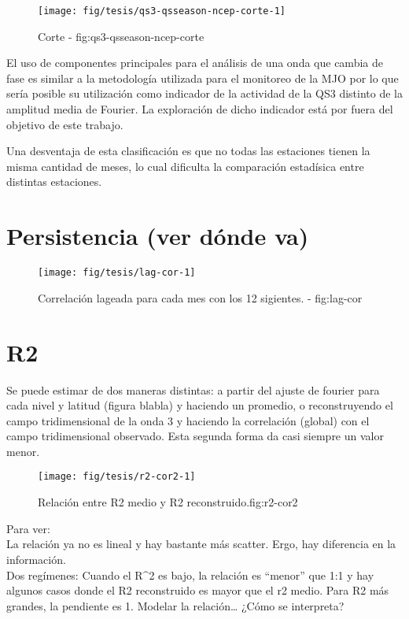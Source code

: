 \documentclass[spanish,a4paper]{book}
\begin{document}
\begin{figure*}
\texttt{[image: fig/tesis/qs3-qsseason-ncep-corte-1]} \caption{Corte - fig:qs3-qsseason-ncep-corte}\label{fig:qs3-qsseason-ncep-corte}
\end{figure*}

El uso de componentes principales para el análisis de una onda que
cambia de fase es similar a la metodología utilizada para el monitoreo
de la MJO por lo que sería posible su utilización como
indicador de la actividad de la QS3 distinto de la amplitud media de
Fourier. La exploración de dicho indicador está por fuera del objetivo
de este trabajo.

Una desventaja de esta clasificación es que no todas las estaciones
tienen la misma cantidad de meses, lo cual dificulta la comparación
estadísica entre distintas estaciones.

\section{Persistencia (ver dónde va)}\label{persistencia-ver-donde-va}

\begin{figure}
\texttt{[image: fig/tesis/lag-cor-1]} \caption{Correlación lageada para cada mes con los 12 sigientes. - fig:lag-cor}\label{fig:lag-cor}
\end{figure}

\section{R2}\label{r2}

Se puede estimar de dos maneras distintas: a partir del ajuste de
fourier para cada nivel y latitud (figura blabla) y haciendo un
promedio, o reconstruyendo el campo tridimensional de la onda 3 y
haciendo la correlación (global) con el campo tridimensional observado.
Esta segunda forma da casi siempre un valor menor.

\begin{figure}
\texttt{[image: fig/tesis/r2-cor2-1]} \caption{Relación entre R2 medio y R2 reconstruido.{fig:r2-cor2}}\label{fig:r2-cor2}
\end{figure}

Para ver:\\
La relación ya no es lineal y hay bastante más scatter. Ergo, hay
diferencia en la información.\\
Dos regímenes: Cuando el R\^{}2 es bajo, la relación es ``menor'' que
1:1 y hay algunos casos donde el R2 reconstruido es mayor que el r2
medio. Para R2 más grandes, la pendiente es 1. Modelar la
relación\ldots{} ¿Cómo se interpreta?
\end{document}
